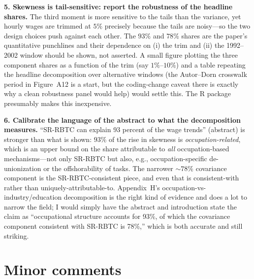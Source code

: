 \documentclass[11pt]{article}
\begin{document}
\textbf{5. Skewness is tail-sensitive: report the robustness of the headline shares.}
The third moment is more sensitive to the tails than the variance, yet hourly wages are trimmed at
$5\%$ precisely because the tails are noisy---so the two design choices push against each other. The
$93\%$ and $78\%$ shares are the paper's quantitative punchlines and their dependence on (i) the trim
and (ii) the 1992--2002 window should be shown, not asserted. A small figure plotting the three
component shares as a function of the trim (say $1\%$--$10\%$) and a table repeating the headline
decomposition over alternative windows (the Autor--Dorn crosswalk period in Figure~A12 is a start,
but the coding-change caveat there is exactly why a clean robustness panel would help) would settle
this. The R package presumably makes this inexpensive.

\textbf{6. Calibrate the language of the abstract to what the decomposition measures.}
``SR-RBTC can explain 93 percent of the wage trends'' (abstract) is stronger than what is shown:
$93\%$ of the rise in skewness is \emph{occupation-related}, which is an upper bound on the share
attributable to \emph{all} occupation-based mechanisms---not only SR-RBTC but also, e.g.,
occupation-specific de-unionization or the offshorability of tasks. The narrower
$\sim\!78\%$ covariance component is the SR-RBTC-consistent piece, and even that is
consistent-with rather than uniquely-attributable-to. Appendix~H's occupation-vs-industry/education
decomposition is the right kind of evidence and does a lot to narrow the field; I would simply have
the abstract and introduction state the claim as ``occupational structure accounts for 93\%, of which
the covariance component consistent with SR-RBTC is 78\%,'' which is both accurate and still striking.

\section*{Minor comments}
\end{document}
